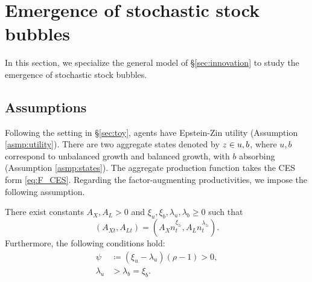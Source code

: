 \documentclass[a4paper,12pt]{article}
\numberwithin{equation}{section}
\theoremstyle{plain}
\begin{document}
\section{Emergence of stochastic stock bubbles}\label{sec:GH_bubble}

In this section, we specialize the general model of \S\ref{sec:innovation} to study the emergence of stochastic stock bubbles.

\subsection{Assumptions}

Following the setting in \S\ref{sec:toy}, agents have Epstein-Zin utility (Assumption \ref{asmp:utility}). There are two aggregate states denoted by $z\in \set{u,b}$, where $u,b$ correspond to unbalanced growth and balanced growth, with $b$ absorbing (Assumption \ref{asmp:states}). The aggregate production function takes the CES form \eqref{eq:F_CES}. Regarding the factor-augmenting productivities, we impose the following assumption.

\begin{asmp}\label{asmp:AZ}
There exist constants $A_X,A_L>0$ and $\xi_u,\xi_b,\lambda_u,\lambda_b\ge 0$ such that
\begin{equation}
    (A_{Xt},A_{Lt})=(A_Xn_t^{\xi_{z_t}},A_Ln_t^{\lambda_{z_t}}). \label{eq:AXLt}
\end{equation}
Furthermore, the following conditions hold:
\begin{subequations}
\begin{align}
    \psi&\coloneqq (\xi_u-\lambda_u)(\rho-1)>0, \label{eq:xi} \\
    \lambda_u&>\lambda_b=\xi_b. \label{eq:alphazeta}
\end{align}
\end{subequations}
\end{asmp}
\end{document}
